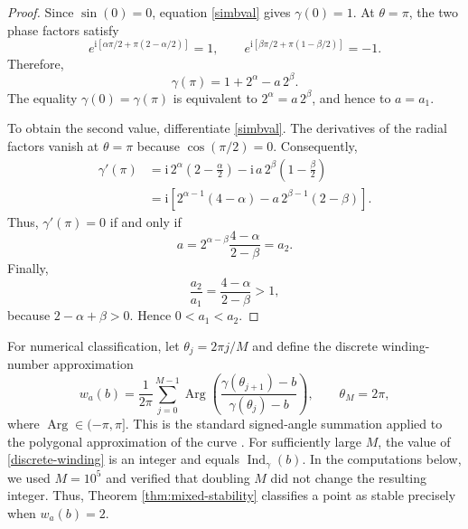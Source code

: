 \documentclass[11pt,a4paper]{article}
\theoremstyle{definition}
\begin{document}
\begin{proof}
Since $\sin(0)=0$, equation \eqref{simbval} gives $\gamma(0)=1$. At $\theta=\pi$, the two phase factors satisfy
\begin{equation*}
e^{\mathrm{i}[\alpha\pi/2+\pi(2-\alpha/2)]}=1,
\qquad
e^{\mathrm{i}[\beta\pi/2+\pi(1-\beta/2)]}=-1.
\end{equation*}
Therefore,
\begin{equation*}
\gamma(\pi)=1+2^\alpha-a\,2^\beta.
\end{equation*}
The equality $\gamma(0)=\gamma(\pi)$ is equivalent to $2^\alpha=a\,2^\beta$, and hence to $a=a_1$.

To obtain the second value, differentiate \eqref{simbval}. The derivatives of the radial factors vanish at $\theta=\pi$ because $\cos(\pi/2)=0$. Consequently,
\begin{align*}
\gamma'(\pi)
&=\mathrm{i}\,2^\alpha\left(2-\frac{\alpha}{2}\right)
-\mathrm{i}\,a\,2^\beta\left(1-\frac{\beta}{2}\right)\\
&=\mathrm{i}\left[2^{\alpha-1}(4-\alpha)
-a\,2^{\beta-1}(2-\beta)\right].
\end{align*}
Thus, $\gamma'(\pi)=0$ if and only if
\begin{equation*}
a=2^{\alpha-\beta}\frac{4-\alpha}{2-\beta}=a_2.
\end{equation*}
Finally,
\begin{equation*}
\frac{a_2}{a_1}=\frac{4-\alpha}{2-\beta}>1,
\end{equation*}
because $2-\alpha+\beta>0$. Hence $0<a_1<a_2$.
\end{proof}

For numerical classification, let $\theta_j=2\pi j/M$ and define the discrete winding-number approximation
\begin{equation}\label{discrete-winding}
w_a(b)=\frac{1}{2\pi}\sum_{j=0}^{M-1}
\operatorname{Arg}\left(
\frac{\gamma(\theta_{j+1})-b}{\gamma(\theta_j)-b}
\right),
\qquad \theta_M=2\pi,
\end{equation}
where $\operatorname{Arg}\in(-\pi,\pi]$. This is the standard signed-angle summation applied to the polygonal approximation of the curve \cite{hormann2001point}. For sufficiently large $M$, the value of \eqref{discrete-winding} is an integer and equals $\operatorname{Ind}_{\gamma}(b)$. In the computations below, we used $M=10^5$ and verified that doubling $M$ did not change the resulting integer. Thus, Theorem \ref{thm:mixed-stability} classifies a point as stable precisely when $w_a(b)=2$.
\end{document}

